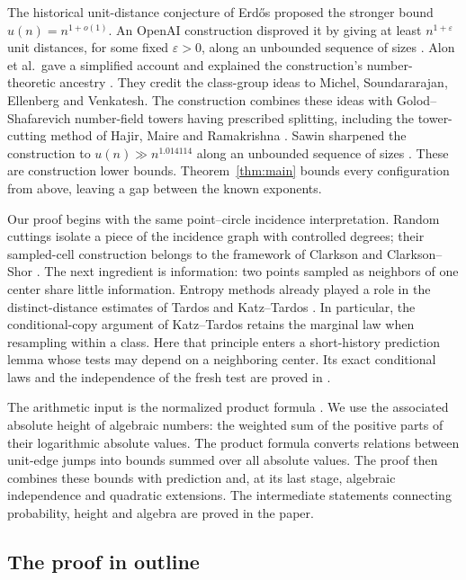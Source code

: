 The historical unit-distance conjecture of Erd\H{o}s proposed the stronger
bound \(u(n)=n^{1+o(1)}\). An OpenAI construction disproved it by giving
at least \(n^{1+\varepsilon}\) unit distances, for some fixed
\(\varepsilon>0\), along an unbounded sequence of sizes
\cite[Theorem~1.1]{openaiUnitLower2026}. Alon et al.\ gave a simplified
account and explained the construction's number-theoretic ancestry
\cite[Sections~1.2--1.3]{alonEtAl2026}. They credit the class-group
ideas to Michel, Soundararajan, Ellenberg and Venkatesh. The construction
combines these ideas with Golod--Shafarevich
number-field towers having prescribed splitting, including the
tower-cutting method of Hajir, Maire and Ramakrishna
\cite{ellenbergVenkatesh2007,golodShafarevich1964,hajirMaireRamakrishna2021}.
Sawin sharpened the construction to \(u(n)\gg n^{1.014114}\) along an
unbounded sequence of sizes \cite[Theorem~1]{sawin2026}.
These are construction lower bounds. Theorem~\ref{thm:main} bounds every
configuration from above, leaving a gap between the known exponents.

Our proof begins with the same point--circle incidence interpretation.
Random cuttings isolate a piece of the incidence graph with controlled
degrees; their sampled-cell construction belongs to the framework of
Clarkson and Clarkson--Shor \cite{Clarkson1987,ClarksonShor1989}.
The next ingredient is information: two points sampled as neighbors of
one center share little information. Entropy methods already played a
role in the distinct-distance estimates of Tardos and Katz--Tardos
\cite{Tardos2003,KatzTardos}. In particular, the conditional-copy
argument of Katz--Tardos retains the marginal law when resampling
within a class. Here that principle enters a short-history prediction
lemma whose tests may depend on a neighboring center. Its exact
conditional laws and the independence of the fresh test are proved in
.

The arithmetic input is the normalized product formula
\cite{ProductFormula}. We use the associated absolute height of
algebraic numbers: the weighted sum of the positive parts of their
logarithmic absolute values. The product formula converts
relations between unit-edge jumps into bounds summed over all absolute
values. The proof then combines these bounds with prediction and, at its
last stage, algebraic independence and quadratic extensions. The
intermediate statements connecting probability, height and algebra are
proved in the paper.

\subsection{The proof in outline}

